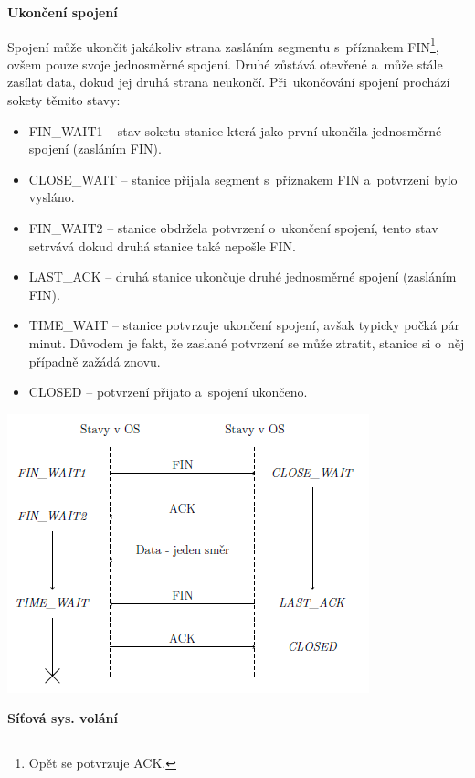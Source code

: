 \vspace{0,5cm}
\textbf{Ukončení spojení}

Spojení může ukončit jakákoliv strana zasláním segmentu s~příznakem FIN\footnote{Opět se potvrzuje ACK.}, ovšem pouze svoje jednosměrné spojení. Druhé zůstává otevřené a~může stále zasílat data, dokud jej druhá strana neukončí. Při~ukončování spojení prochází sokety těmito stavy:
\begin{itemize}
	\item FIN\_WAIT1 -- stav soketu stanice která jako první ukončila jednosměrné spojení (zasláním FIN).
	\item CLOSE\_WAIT -- stanice přijala segment s~příznakem FIN a~potvrzení bylo vysláno. 
	\item FIN\_WAIT2 -- stanice obdržela potvrzení o~ukončení spojení, tento stav setrvává dokud druhá stanice také nepošle FIN. 
	\item LAST\_ACK -- druhá stanice ukončuje druhé jednosměrné spojení (zasláním FIN).
	\item TIME\_WAIT -- stanice potvrzuje ukončení spojení, avšak typicky počká pár minut. Důvodem je fakt, že zaslané potvrzení se může ztratit, stanice si o~něj případně zažádá znovu. 
	\item CLOSED -- potvrzení přijato a~spojení ukončeno.
\end{itemize}

\begin{center}
	\includegraphics[scale=1]{images/network_tcp_close.png}
\end{center}

\begin{Large}
	\vspace{0,5cm}
	\textbf{Síťová sys. volání}
\end{Large}

